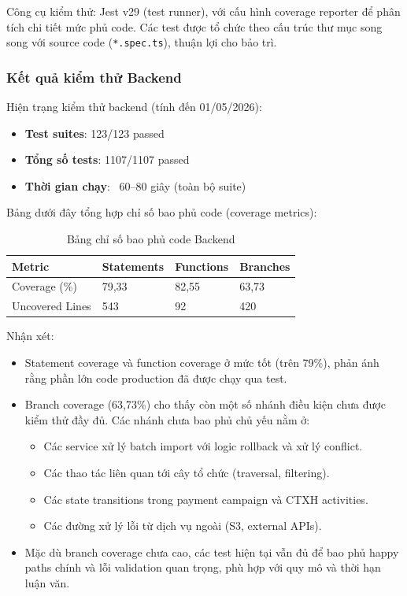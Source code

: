 Công cụ kiểm thử: Jest v29 (test runner), với cấu hình coverage reporter để phân tích chi tiết mức phủ code. Các test được tổ chức theo cấu trúc thư mục song song với source code (\texttt{*.spec.ts}), thuận lợi cho bảo trì.

\subsubsection{Kết quả kiểm thử Backend}
Hiện trạng kiểm thử backend (tính đến 01/05/2026):
\begin{itemize}
	\item \textbf{Test suites}: 123/123 passed
	\item \textbf{Tổng số tests}: 1107/1107 passed
	\item \textbf{Thời gian chạy}: ~60--80 giây (toàn bộ suite)
\end{itemize}

Bảng dưới đây tổng hợp chỉ số bao phủ code (coverage metrics):

\begin{table}[H]
\centering
\renewcommand{\arraystretch}{1.2}
\small
\begin{tabular}{|p{3.5cm}|p{2.0cm}|p{2.0cm}|p{2.0cm}|}
\hline
\textbf{Metric} & \textbf{Statements} & \textbf{Functions} & \textbf{Branches} \\
\hline
Coverage (\%) & 79,33 & 82,55 & 63,73 \\
\hline
Uncovered Lines & 543 & 92 & 420 \\
\hline
\end{tabular}
\caption{Bảng chỉ số bao phủ code Backend}
\end{table}

Nhận xét:
\begin{itemize}
	\item Statement coverage và function coverage ở mức tốt (trên 79\%), phản ánh rằng phần lớn code production đã được chạy qua test.
	\item Branch coverage (63,73\%) cho thấy còn một số nhánh điều kiện chưa được kiểm thử đầy đủ. Các nhánh chưa bao phủ chủ yếu nằm ở:
	\begin{itemize}
		\item Các service xử lý batch import với logic rollback và xử lý conflict.
		\item Các thao tác liên quan tới cây tổ chức (traversal, filtering).
		\item Các state transitions trong payment campaign và CTXH activities.
		\item Các đường xử lý lỗi từ dịch vụ ngoài (S3, external APIs).
	\end{itemize}
	\item Mặc dù branch coverage chưa cao, các test hiện tại vẫn đủ để bao phủ happy paths chính và lỗi validation quan trọng, phù hợp với quy mô và thời hạn luận văn.
\end{itemize}

